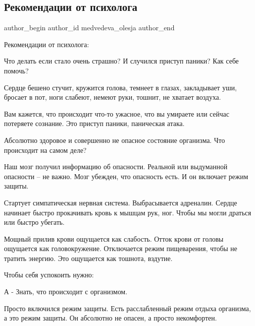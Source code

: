  
 
 
 
 
 
\subsection{Рекомендации от психолога}
\label{sec:24_02_2022.tg.medvedeva_olesja.3.rekomendacii_ot_psihologa}
 
\ifcmt
 author_begin
   author_id medvedeva_olesja
 author_end
\fi

Рекомендации от психолога:

Что делать если стало очень страшно? И случился приступ паники? Как себе
помочь? 

Сердце бешено стучит, кружится голова, темнеет в глазах, закладывает уши,
бросает в пот, ноги слабеют, немеют руки, тошнит, не хватает воздуха. 

Вам кажется, что происходит что-то ужасное, что вы умираете или сейчас
потеряете сознание. Это приступ паники, паническая атака. 

Абсолютно здоровое и совершенно не опасное состояние организма. Что происходит
на самом деле? 

Наш мозг получил информацию об опасности. Реальной или выдуманной опасности –
не важно. Мозг убежден, что опасность есть. И он включает режим защиты. 

Стартует симпатическая нервная система. Выбрасывается адреналин. Сердце
начинает быстро прокачивать кровь к мышцам рук, ног. Чтобы мы могли драться или
быстро убегать. 

Мощный прилив крови ощущается как слабость. Отток крови от головы ощущается как
головокружение. Отключается режим пищеварения, чтобы не тратить энергию. Это
ощущается как тошнота, вздутие. 

Чтобы себя успокоить нужно:

А - Знать, что происходит с организмом. 

Просто включился режим защиты. Есть расслабленный режим отдыха организма, а это
режим защиты. Он абсолютно не опасен, а просто некомфортен.


